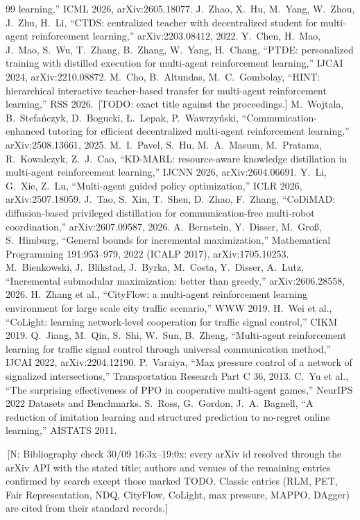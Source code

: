 \documentclass[11pt]{article}
\theoremstyle{definition}
\newif\ifshownotes\shownotestrue
\newcommand{\NOTE}[1]{\ifshownotes{\color{notecol}\,\textsf{\footnotesize[N: #1]}}\fi}
\newcommand{\TODO}[1]{\ifshownotes{\color{todocol}\,\textsf{\footnotesize[TODO: #1]}}\fi}
\begin{document}
\begin{thebibliography}{99}
learning,'' ICML 2026, arXiv:2605.18077.
 J.~Zhao, X.~Hu, M.~Yang, W.~Zhou, J.~Zhu, H.~Li, ``CTDS: centralized teacher with decentralized student
for multi-agent reinforcement learning,'' arXiv:2203.08412, 2022.
 Y.~Chen, H.~Mao, J.~Mao, S.~Wu, T.~Zhang, B.~Zhang, W.~Yang, H.~Chang, ``PTDE: personalized training with
distilled execution for multi-agent reinforcement learning,'' IJCAI 2024, arXiv:2210.08872.
 M.~Cho, B.~Altundas, M.~C.~Gombolay, ``HINT: hierarchical interactive teacher-based transfer for
multi-agent reinforcement learning,'' RSS 2026. \TODO{exact title against the proceedings.}
 M.~Wojtala, B.~Stefa\'nczyk, D.~Bogucki, \L.~Lepak, P.~Wawrzy\'nski, ``Communication-enhanced tutoring
for efficient decentralized multi-agent reinforcement learning,'' arXiv:2508.13661, 2025.
 M.~I.~Pavel, S.~Hu, M.~A.~Masum, M.~Pratama, R.~Kowalczyk, Z.~J.~Cao, ``KD-MARL: resource-aware knowledge
distillation in multi-agent reinforcement learning,'' IJCNN 2026, arXiv:2604.06691.
 Y.~Li, G.~Xie, Z.~Lu, ``Multi-agent guided policy optimization,'' ICLR 2026, arXiv:2507.18059.
 J.~Tao, S.~Xin, T.~Shen, D.~Zhao, F.~Zhang, ``CoDiMAD: diffusion-based privileged distillation for
communication-free multi-robot coordination,'' arXiv:2607.09587, 2026.
 A.~Bernstein, Y.~Disser, M.~Gro{\ss}, S.~Himburg, ``General bounds for incremental
maximization,'' Mathematical Programming 191:953--979, 2022 (ICALP 2017), arXiv:1705.10253.
 M.~Bienkowski, J.~Blikstad, J.~Byrka, M.~Costa, Y.~Disser, A.~Lutz, ``Incremental submodular
maximization: better than greedy,'' arXiv:2606.28558, 2026.
 H.~Zhang et al., ``CityFlow: a multi-agent reinforcement learning environment for large scale city
traffic scenario,'' WWW 2019.
 H.~Wei et al., ``CoLight: learning network-level cooperation for traffic signal control,'' CIKM 2019.
 Q.~Jiang, M.~Qin, S.~Shi, W.~Sun, B.~Zheng, ``Multi-agent reinforcement learning for traffic signal
control through universal communication method,'' IJCAI 2022, arXiv:2204.12190.
 P.~Varaiya, ``Max pressure control of a network of signalized intersections,'' Transportation
Research Part C 36, 2013.
 C.~Yu et al., ``The surprising effectiveness of PPO in cooperative multi-agent games,'' NeurIPS 2022
Datasets and Benchmarks.
 S.~Ross, G.~Gordon, J.~A.~Bagnell, ``A reduction of imitation learning and structured prediction to
no-regret online learning,'' AISTATS 2011.
\end{thebibliography}
\NOTE{Bibliography check 30/09 16:3x--19:0x: every arXiv id resolved through the arXiv API with the stated title; authors
and venues of the remaining entries confirmed by search except those marked TODO. Classic entries (RLM, PET, Fair
Representation, NDQ, CityFlow, CoLight, max pressure, MAPPO, DAgger) are cited from their standard records.}
\end{document}
